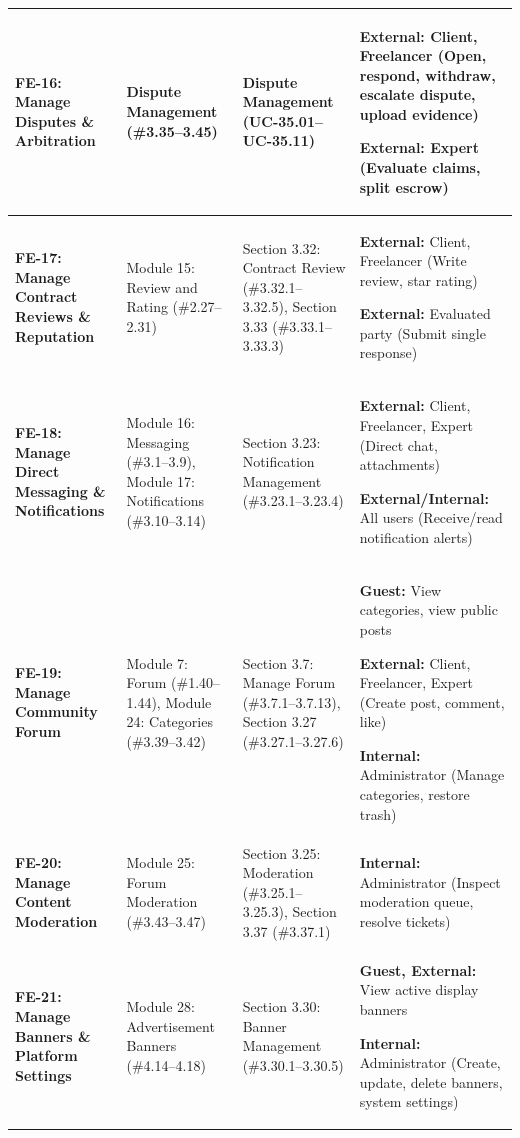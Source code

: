 \begin{longtable}{|>{\raggedright\arraybackslash}p{2.8cm}|>{\raggedright\arraybackslash}p{2.7cm}|>{\raggedright\arraybackslash}p{3.5cm}|>{\raggedright\arraybackslash}p{5.0cm}|}
\textbf{FE-16: Manage Disputes \& Arbitration} & 
Dispute Management (\#3.35--3.45) & 
Dispute Management (UC-35.01--UC-35.11) & 
\textbf{External:} Client, Freelancer (Open, respond, withdraw, escalate dispute, upload evidence)\par
\textbf{External:} Expert (Evaluate claims, split escrow) \\ \hline

\textbf{FE-17: Manage Contract Reviews \& Reputation} & 
Module 15: Review and Rating (\#2.27--2.31) & 
Section 3.32: Contract Review (\#3.32.1--3.32.5), Section 3.33 (\#3.33.1--3.33.3) & 
\textbf{External:} Client, Freelancer (Write review, star rating)\par
\textbf{External:} Evaluated party (Submit single response) \\ \hline

\textbf{FE-18: Manage Direct Messaging \& Notifications} & 
Module 16: Messaging (\#3.1--3.9), Module 17: Notifications (\#3.10--3.14) & 
Section 3.23: Notification Management (\#3.23.1--3.23.4) & 
\textbf{External:} Client, Freelancer, Expert (Direct chat, attachments)\par
\textbf{External/Internal:} All users (Receive/read notification alerts) \\ \hline

\textbf{FE-19: Manage Community Forum} & 
Module 7: Forum (\#1.40--1.44), Module 24: Categories (\#3.39--3.42) & 
Section 3.7: Manage Forum (\#3.7.1--3.7.13), Section 3.27 (\#3.27.1--3.27.6) & 
\textbf{Guest:} View categories, view public posts\par
\textbf{External:} Client, Freelancer, Expert (Create post, comment, like)\par
\textbf{Internal:} Administrator (Manage categories, restore trash) \\ \hline

\textbf{FE-20: Manage Content Moderation} & 
Module 25: Forum Moderation (\#3.43--3.47) & 
Section 3.25: Moderation (\#3.25.1--3.25.3), Section 3.37 (\#3.37.1) & 
\textbf{Internal:} Administrator (Inspect moderation queue, resolve tickets) \\ \hline

\textbf{FE-21: Manage Banners \& Platform Settings} & 
Module 28: Advertisement Banners (\#4.14--4.18) & 
Section 3.30: Banner Management (\#3.30.1--3.30.5) & 
\textbf{Guest, External:} View active display banners\par
\textbf{Internal:} Administrator (Create, update, delete banners, system settings) \\ \hline

\end{longtable}
\endgroup

